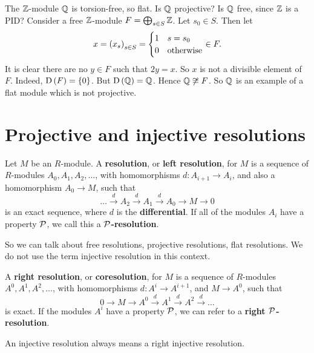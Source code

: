 \begin{example*}
The $ \mathbb{Z} $-module $ \mathbb{Q} $ is torsion-free, so flat. Is $ \mathbb{Q} $ projective? Is $ \mathbb{Q} $ free, since $ \mathbb{Z} $ is a PID? Consider a free $ \mathbb{Z} $-module $ F = \bigoplus_{s \in S} \mathbb{Z} $. Let $ s_0 \in S $. Then let
$$ x = \br{x_s}_{s \in S} =
\begin{cases}
1 & s = s_0 \\
0 & \text{otherwise}
\end{cases}
\in F. $$
It is clear there are no $ y \in F $ such that $ 2y = x $. So $ x $ is not a divisible element of $ F $. Indeed, $ \D\br{F} = \cbr{0} $. But $ \D\br{\QQ} = \QQ $. Hence $ \mathbb{Q} \not\cong F $. So $ \mathbb{Q} $ is an example of a flat module which is not projective.
\end{example*}

\pagebreak

\section{Projective and injective resolutions}

\begin{definition}
Let $ M $ be an $ R $-module. A \textbf{resolution}, or \textbf{left resolution}, for $ M $ is a sequence of $ R $-modules $ A_0, A_1, A_2, \dots $, with homomorphisms $ d : A_{i + 1} \to A_i $, and also a homomorphism $ A_0 \to M $, such that
$$ \dots \xrightarrow{d} A_2 \xrightarrow{d} A_1 \xrightarrow{d} A_0 \to M \to 0 $$
is an exact sequence, where $ d $ is the \textbf{differential}. If all of the modules $ A_i $ have a property $ \mathcal{P} $, we call this a \textbf{$ \mathcal{P} $-resolution}.
\end{definition}

So we can talk about free resolutions, projective resolutions, flat resolutions. We do not use the term injective resolution in this context.

\begin{definition}
A \textbf{right resolution}, or \textbf{coresolution}, for $ M $ is a sequence of $ R $-modules $ A^0, A^1, A^2, \dots $, with homomorphisms $ d : A^i \to A^{i + 1} $, and $ M \to A^0 $, such that
$$ 0 \to M \to A^0 \xrightarrow{d} A^1 \xrightarrow{d} A^2 \xrightarrow{d} \dots $$
is exact. If the modules $ A^i $ have a property $ \mathcal{P} $, we can refer to a \textbf{right $ \mathcal{P} $-resolution}.
\end{definition}

An injective resolution always means a right injective resolution.

